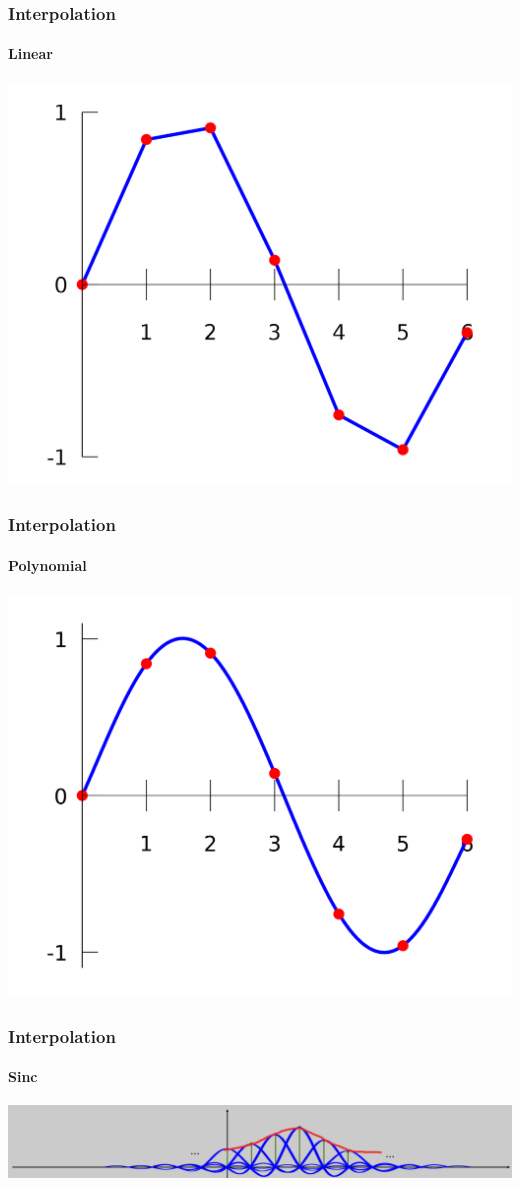\documentclass[aspectratio=169]{beamer}
\begin{document}
\begin{frame}
    \frametitle{Interpolation}
    \framesubtitle{Linear}

    \centering
    \includegraphics[height=0.9\textheight]{1280px-Interpolation_example_linear.svg.png}
\end{frame}

\begin{frame}
    \frametitle{Interpolation}
    \framesubtitle{Polynomial}

    \centering
    \includegraphics[height=0.9\textheight]{1280px-Interpolation_example_polynomial.svg.png}
\end{frame}

\begin{frame}
    \frametitle{Interpolation}
    \framesubtitle{Sinc}

    \centering
    \includegraphics[width=\textwidth]{Screenshot_2020-11-15 Lecture11B - Lecture11B pdf.png}
\end{frame}
\end{document}
